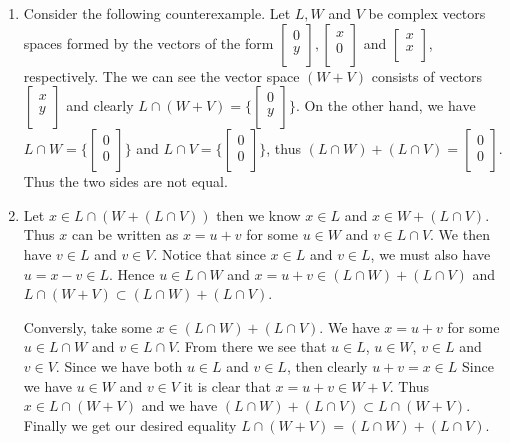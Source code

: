 \begin{solution}
  \begin{enumerate}[label=(\alph*)]
    \item Consider the following counterexample.
      Let $L, W$ and $V$ be complex vectors spaces formed by the vectors of the form $\begin{bmatrix} 0\\ y\\ \end{bmatrix}, \begin{bmatrix} x\\ 0\\ \end{bmatrix}$ and $\begin{bmatrix} x\\ x\\ \end{bmatrix}$, respectively.
      The we can see the vector space $(W + V)$ consists of vectors $\begin{bmatrix} x\\ y\\ \end{bmatrix}$ and clearly $L \cap (W + V) = \{\begin{bmatrix} 0\\ y\\ \end{bmatrix}\}$.
      On the other hand, we have $L \cap W = \{\begin{bmatrix} 0\\ 0\\ \end{bmatrix}\}$ and $L \cap V = \{\begin{bmatrix} 0\\ 0\\ \end{bmatrix}\}$, thus $(L \cap W) + (L \cap V) = \begin{bmatrix} 0\\ 0\\ \end{bmatrix}$.
      Thus the two sides are not equal.
    \item Let $x \in L \cap (W + (L \cap V))$ then we know $x \in L$ and $x \in W + (L \cap V)$.
      Thus $x$ can be written as $x = u + v$ for some $u \in W$ and $v \in L \cap V$.
      We then have $v \in L$ and $v \in V$.
      Notice that since $x \in L$ and $v \in L$, we must also have $u = x - v \in L$.
      Hence $u \in L \cap W$ and $x = u + v \in (L \cap W) + (L \cap V)$ and $L \cap (W + V) \subset (L \cap W) + (L \cap V)$.

      Conversly, take some $x \in (L \cap W) + (L \cap V)$.
      We have $x = u + v$ for some $u \in L \cap W$ and $v \in L \cap V$.
      From there we see that $u \in L$, $u \in W$, $v \in L$ and $v \in V$.
      Since we have both $u \in L$ and $v \in L$, then clearly $u + v = x \in L$
      Since we have $u \in W$ and $v \in V$ it is clear that $x = u + v \in W + V$.
      Thus $x \in L \cap (W + V)$ and we have $(L \cap W) + (L \cap V) \subset L \cap (W + V)$.
      Finally we get our desired equality $L \cap (W + V) = (L \cap W) + (L \cap V)$.
  \end{enumerate}
\end{solution}
